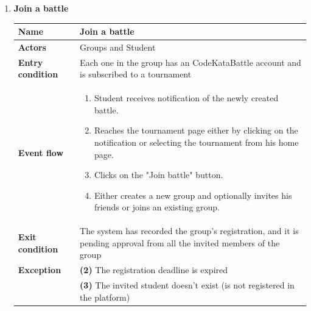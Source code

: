 \documentclass{article}
\begin{document}
\begin{enumerate}[label=\textbf{UC\arabic*}:]
        \item \textbf{Join a battle}
             \begin{center}
        \begin{tabular}{ | m{8em} | m{10cm}|  } 
            \hline 
            \textbf{Name} & Join a battle\\[1ex] 
            \hline 
            \textbf{Actors} & Groups and Student \\[1ex] 
            \hline 
            \textbf{Entry condition} & Each one in the group has an CodeKataBattle account and is subscribed to a tournament \\[1ex] 
            \hline 
            \textbf{Event flow} & \begin{enumerate}[label=\textbf{\arabic*}:]
                \item Student receives notification of the newly created battle.  
                \item Reaches the tournament page either by clicking on the notification or selecting the tournament from his home page.
                \item Clicks on the "Join battle" button.
                \item Either creates a new group and optionally invites his friends or joins an existing group.
            \end{enumerate} \\[1ex]
            \hline 
            \textbf{Exit condition} & The system has recorded the group's registration, and it is  pending approval from all the invited members of the group \\[1ex]
            \hline
            \textbf{Exception} & \textbf{(2)} The registration deadline is expired \\
                                & \textbf{(3)} The invited student doesn't exist (is not registered in the platform)\\[1ex]
            \hline 

        \end{tabular}
        \end{center}






\end{enumerate}
\end{document}
